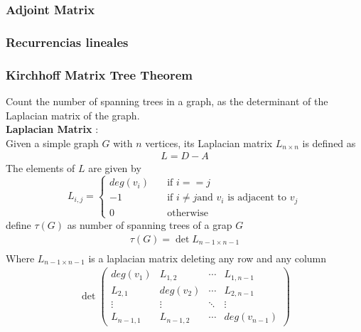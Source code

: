 	\subsubsection{Adjoint Matrix}
	
	\subsubsection{Recurrencias lineales}
	
	\subsubsection{Kirchhoff Matrix Tree Theorem}
	Count the number of spanning trees in a graph, as the determinant of the Laplacian matrix of the graph. 
	\\
	\textbf{Laplacian Matrix} :
	\\Given a simple graph $G$ with $n$ vertices,
	its Laplacian matrix $L_{n\times n}$ is defined as\\
	\begin{align*}
		L=D-A
	\end{align*}
	The elements of $L$ are given by
	\[ L_{i,j} =
	\begin{cases}
		deg(v_{i})       & \quad \text{if } i == j\\
		-1  & \quad \text{if } i \neq j \text{and } v_{i} \text{ is adjacent to }v_{j}\\
		0 & \quad \text{otherwise}
	\end{cases}
	\]
		define $\tau(G  )$ as number of spanning trees of a grap $G$
	\begin{align*}
		\tau(G) = \det L_{n-1\times n-1}\\
	\end{align*}
	Where  $L_{n-1 \times n-1}$ is a laplacian matrix deleting 
	any row and any column
	\begin{align*}
		\det
		\begin{pmatrix}
			deg(v_{1}) & L_{1,2} & \cdots & L_{1,n-1} \\
		L_{2,1} & deg(v_{2}) & \cdots & L_{2,n-1} \\
		\vdots  & \vdots  & \ddots & \vdots  \\
		L_{n-1,1} & L_{n-1,2} & \cdots & deg(v_{n-1}) 
		\end{pmatrix}
	\end{align*}
